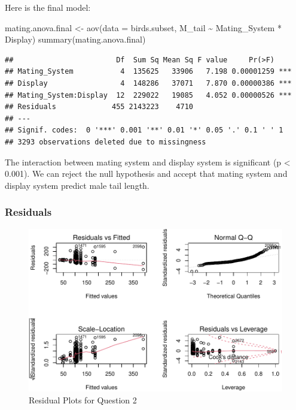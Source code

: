 \documentclass[
  12pt,
]{article}
\newenvironment{Shaded}{\begin{snugshade}}{\end{snugshade}}
\newcommand{\AttributeTok}[1]{\textcolor[rgb]{0.77,0.63,0.00}{#1}}
\newcommand{\FunctionTok}[1]{\textcolor[rgb]{0.00,0.00,0.00}{#1}}
\newcommand{\NormalTok}[1]{#1}
\newcommand{\OtherTok}[1]{\textcolor[rgb]{0.56,0.35,0.01}{#1}}
\newcommand{\SpecialCharTok}[1]{\textcolor[rgb]{0.00,0.00,0.00}{#1}}
\begin{document}
\newpage

Here is the final model:

\begin{Shaded}
\begin{Highlighting}[]
\NormalTok{mating.anova.final }\OtherTok{\textless{}{-}} \FunctionTok{aov}\NormalTok{(}\AttributeTok{data =}\NormalTok{ birds.subset, M\_tail }\SpecialCharTok{\textasciitilde{}}\NormalTok{ Mating\_System }\SpecialCharTok{*}\NormalTok{ Display)}
\FunctionTok{summary}\NormalTok{(mating.anova.final)}
\end{Highlighting}
\end{Shaded}

\begin{verbatim}
##                        Df  Sum Sq Mean Sq F value     Pr(>F)    
## Mating_System           4  135625   33906   7.198 0.00001259 ***
## Display                 4  148286   37071   7.870 0.00000386 ***
## Mating_System:Display  12  229022   19085   4.052 0.00000526 ***
## Residuals             455 2143223    4710                       
## ---
## Signif. codes:  0 '***' 0.001 '**' 0.01 '*' 0.05 '.' 0.1 ' ' 1
## 3293 observations deleted due to missingness
\end{verbatim}

The interaction between mating system and display system is significant
(p \textless{} 0.001). We can reject the null hypothesis and accept that
mating system and display system predict male tail length.

\hypertarget{residuals-1}{%
\subsubsection{Residuals}\label{residuals-1}}

\begin{figure}
\centering
\includegraphics{Project_Code_files/figure-latex/q-2 residual-1.pdf}
\caption{Residual Plots for Question 2}
\end{figure}
\end{document}
